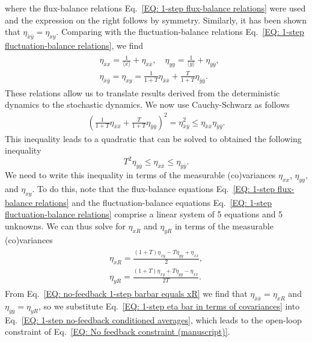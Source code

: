 \documentclass[%
 reprint,prx,
superscriptaddress,
%
%
%
%
%
%
%
%
%
 amsmath,amssymb,
 aps,
%
%
%
%
%
%
]{revtex4-2}
\newcommand{\lb}{\langle}
\newcommand{\rb}{\rangle}
\begin{document}
where the flux-balance relations Eq.~\eqref{EQ: 1-step flux-balance relations} were used and the expression on the right follows by symmetry.
Similarly, it has been shown \cite{Hilfinger2011} that $\eta_{\bar{x}\bar{y}} = \eta_{xy}$.
Comparing with the fluctuation-balance relations Eq.~\eqref{EQ: 1-step fluctuation-balance relations}, we find 
\begin{align}
\begin{split}
&\eta_{xx} = \frac{1}{\lb x \rb} + \eta_{\bar{x}\bar{x}} ,\quad \eta_{yy} = \frac{1}{\lb y \rb} + \eta_{\bar{y}\bar{y}} , \\
&\eta_{\bar{x}\bar{y}} = \eta_{xy} = \frac{1}{1+T}\eta_{\bar{x}\bar{x}}  + \frac{T}{1+T}\eta_{\bar{y}\bar{y}}  . 
\end{split}
\label{EQ: 1-step no-feedback fluctuation-balance}
\end{align}
These relations allow us to translate results derived from the deterministic dynamics to the stochastic dynamics. We now use Cauchy-Schwarz as follows
\begin{align*}
 \left(\frac{1}{1+T}\eta_{\bar{x}\bar{x}}  + \frac{T}{1+T}\eta_{\bar{y}\bar{y}}\right)^{2} = \eta_{\bar{x}\bar{y}}^{2} \leq \eta_{\bar{x}\bar{x}}\eta_{\bar{y}\bar{y}} .
\end{align*}
This inequality leads to a quadratic that can be solved to obtained the following inequality
\begin{equation}
T^2 \eta_{\bar{y}\bar{y}} \leq \eta_{\bar{x}\bar{x}} \leq \eta_{\bar{y}\bar{y}}  .
\label{EQ: 1-step no-feedback conditioned averages}
\end{equation}
We need to write this inequality in terms of the measurable (co)variances $\eta_{xx}$, $\eta_{yy}$, and $\eta_{xy}$. To do this, note that the flux-balance equations 
Eq.~\eqref{EQ: 1-step flux-balance relations} and the fluctuation-balance equations Eq.~\eqref{EQ: 1-step fluctuation-balance relations} comprise a linear system of 5 equations 
and 5 unknowns. We can thus solve for $\eta_{xR}$ and $\eta_{yR}$ in terms of the measurable (co)variances
\begin{align}
\begin{split}
 \eta_{xR} = \frac{(1+T)\eta_{xy} - T\eta_{yy}+\eta_{xx}}{2}, \\
 \eta_{yR} = \frac{(1+T)\eta_{xy} + T\eta_{yy}-\eta_{xx}}{2T}  .
\end{split}
\label{EQ: 1-step eta bar in terms of covariances}
\end{align}
From Eq.~\eqref{EQ: no-feedback 1-step barbar equals xR} we find that $\eta_{\bar{x}\bar{x}} = \eta_{xR}$ and $\eta_{\bar{y}\bar{y}} = \eta_{yR}$, 
so we substitute Eq.~\eqref{EQ: 1-step eta bar in terms of covariances} into Eq.~\eqref{EQ: 1-step no-feedback conditioned averages}, which leads to the open-loop constraint of Eq.~\eqref{EQ: No feedback constraint (manuscript)}. 
\end{document}
